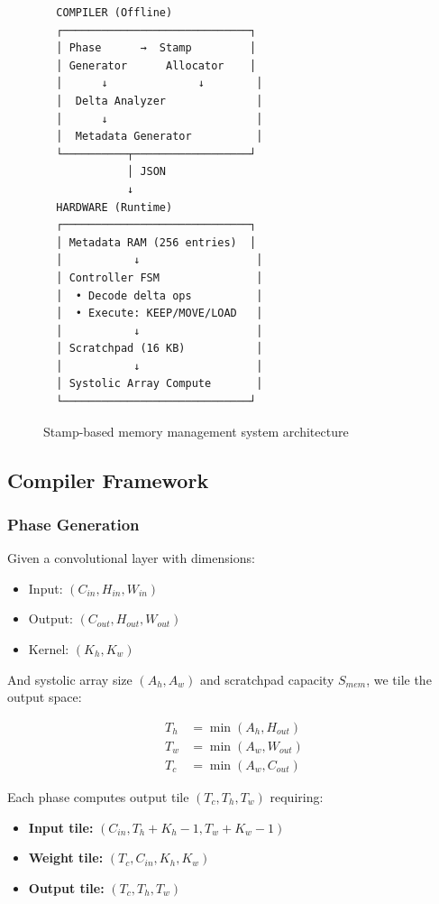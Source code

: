 \documentclass[conference]{IEEEtran}
\begin{document}
\begin{figure}[t]
\centering
\small
\begin{verbatim}
  COMPILER (Offline)
  ┌─────────────────────────────┐
  │ Phase      →  Stamp         │
  │ Generator      Allocator    │
  │      ↓              ↓        │
  │  Delta Analyzer              │
  │      ↓                       │
  │  Metadata Generator          │
  └──────────┬──────────────────┘
             │ JSON
             ↓
  HARDWARE (Runtime)
  ┌─────────────────────────────┐
  │ Metadata RAM (256 entries)  │
  │           ↓                  │
  │ Controller FSM               │
  │  • Decode delta ops          │
  │  • Execute: KEEP/MOVE/LOAD   │
  │           ↓                  │
  │ Scratchpad (16 KB)           │
  │           ↓                  │
  │ Systolic Array Compute       │
  └─────────────────────────────┘
\end{verbatim}
\caption{Stamp-based memory management system architecture}
\label{fig:overview}
\end{figure}

\subsection{Compiler Framework}

\subsubsection{Phase Generation}

Given a convolutional layer with dimensions:
\begin{itemize}
\item Input: $(C_{in}, H_{in}, W_{in})$
\item Output: $(C_{out}, H_{out}, W_{out})$
\item Kernel: $(K_h, K_w)$
\end{itemize}

And systolic array size $(A_h, A_w)$ and scratchpad capacity $S_{mem}$, we tile the output space:

\begin{align}
T_h &= \min(A_h, H_{out}) \\
T_w &= \min(A_w, W_{out}) \\
T_c &= \min(A_w, C_{out})
\end{align}

Each phase computes output tile $(T_c, T_h, T_w)$ requiring:
\begin{itemize}
\item \textbf{Input tile:} $(C_{in}, T_h + K_h - 1, T_w + K_w - 1)$
\item \textbf{Weight tile:} $(T_c, C_{in}, K_h, K_w)$
\item \textbf{Output tile:} $(T_c, T_h, T_w)$
\end{itemize}
\end{document}
